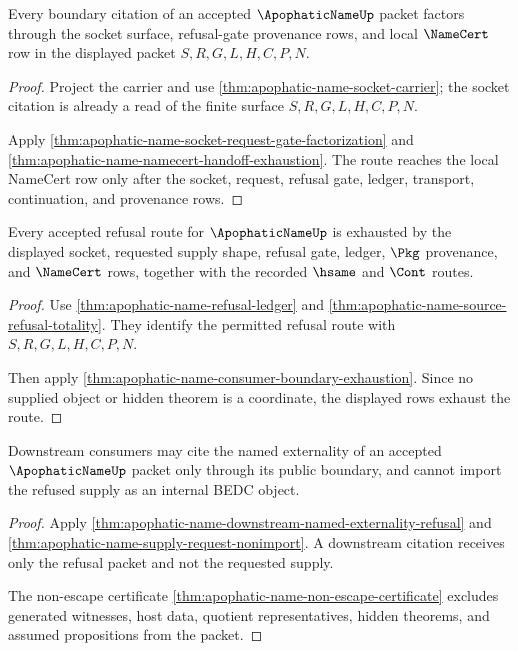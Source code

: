 \begin{theorem}
\label{thm:apophatic-name-boundary-socket-provenance}
Every boundary citation of an accepted $\ApophaticNameUp$ packet factors through the socket surface, refusal-gate provenance rows, and local $\NameCert$ row in the displayed packet $S,R,G,L,H,C,P,N$.
\end{theorem}
\begin{proof}
Project the carrier and use \autoref{thm:apophatic-name-socket-carrier}; the socket citation is already a read of the finite surface $S,R,G,L,H,C,P,N$.

Apply \autoref{thm:apophatic-name-socket-request-gate-factorization} and \autoref{thm:apophatic-name-namecert-handoff-exhaustion}. The route reaches the local NameCert row only after the socket, request, refusal gate, ledger, transport, continuation, and provenance rows.
\end{proof}

\begin{theorem}
\label{thm:apophatic-name-refusal-gate-route-totality}
Every accepted refusal route for $\ApophaticNameUp$ is exhausted by the displayed socket, requested supply shape, refusal gate, ledger, $\Pkg$ provenance, and $\NameCert$ rows, together with the recorded $\hsame$ and $\Cont$ routes.
\end{theorem}
\begin{proof}
Use \autoref{thm:apophatic-name-refusal-ledger} and \autoref{thm:apophatic-name-source-refusal-totality}. They identify the permitted refusal route with $S,R,G,L,H,C,P,N$.

Then apply \autoref{thm:apophatic-name-consumer-boundary-exhaustion}. Since no supplied object or hidden theorem is a coordinate, the displayed rows exhaust the route.
\end{proof}

\begin{theorem}
\label{thm:apophatic-name-downstream-nonimport}
Downstream consumers may cite the named externality of an accepted $\ApophaticNameUp$ packet only through its public boundary, and cannot import the refused supply as an internal BEDC object.
\end{theorem}
\begin{proof}
Apply \autoref{thm:apophatic-name-downstream-named-externality-refusal} and \autoref{thm:apophatic-name-supply-request-nonimport}. A downstream citation receives only the refusal packet and not the requested supply.

The non-escape certificate \autoref{thm:apophatic-name-non-escape-certificate} excludes generated witnesses, host data, quotient representatives, hidden theorems, and assumed propositions from the packet.
\end{proof}


